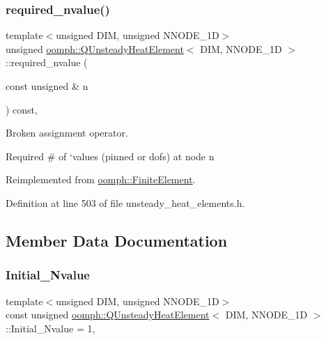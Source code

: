 \subsubsection{\texorpdfstring{required\+\_\+nvalue()}{required\_nvalue()}}
{\footnotesize\ttfamily template$<$unsigned D\+IM, unsigned N\+N\+O\+D\+E\+\_\+1D$>$ \\
unsigned \hyperlink{classoomph_1_1QUnsteadyHeatElement}{oomph\+::\+Q\+Unsteady\+Heat\+Element}$<$ D\+IM, N\+N\+O\+D\+E\+\_\+1D $>$\+::required\+\_\+nvalue (\begin{DoxyParamCaption}\item[{const unsigned \&}]{n }\end{DoxyParamCaption}) const\hspace{0.3cm}{\ttfamily [inline]}, {\ttfamily [virtual]}}



Broken assignment operator. 

Required \# of `values\textquotesingle{} (pinned or dofs) at node n 

Reimplemented from \hyperlink{classoomph_1_1FiniteElement_a56610c60d5bc2d7c27407a1455471b1a}{oomph\+::\+Finite\+Element}.



Definition at line 503 of file unsteady\+\_\+heat\+\_\+elements.\+h.



\subsection{Member Data Documentation}
\mbox{\label{classoomph_1_1QUnsteadyHeatElement_ad6279983f8f8301b1c3d9ec1160a53a0}} 
\subsubsection{\texorpdfstring{Initial\+\_\+\+Nvalue}{Initial\_Nvalue}}
{\footnotesize\ttfamily template$<$unsigned D\+IM, unsigned N\+N\+O\+D\+E\+\_\+1D$>$ \\
const unsigned \hyperlink{classoomph_1_1QUnsteadyHeatElement}{oomph\+::\+Q\+Unsteady\+Heat\+Element}$<$ D\+IM, N\+N\+O\+D\+E\+\_\+1D $>$\+::Initial\+\_\+\+Nvalue = 1\hspace{0.3cm}{\ttfamily [static]}, {\ttfamily [private]}}



